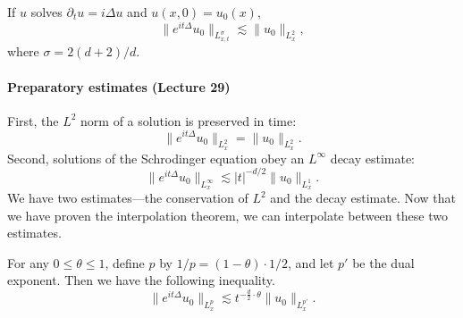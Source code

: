 \begin{theorem}
If $u$ solves $\partial_tu=i\Delta u$ and $u(x,0)=u_0(x)$,
\[\|e^{it\Delta}u_0\|_{L^\sigma_{x,t}}\lesssim\|u_0\|_{L^2_x},\tag{2}\]
where $\sigma=2(d+2)/d$.
\end{theorem}
\paragraph{Preparatory estimates (Lecture 29)}
First, the $L^2$ norm of a solution is preserved in time:
\[\|e^{it\Delta}u_0\|_{L^2_x}=\|u_0\|_{L^2_x}.\]
Second, solutions of the Schrodinger equation obey an $L^\infty$ decay estimate:
\[\|e^{it\Delta}u_0\|_{L^\infty_x}\lesssim|t|^{-d/2}\|u_0\|_{L^1_x}.\]
We have two estimates---the conservation of $L^2$ and the decay estimate. Now that we have proven the interpolation theorem, we can interpolate between these two estimates.
\begin{proposition}
For any $0\leq\theta\leq1$, define $p$ by $1/p=(1-\theta)\cdot1/2$, and let $p'$ be the dual exponent. Then we have the following inequality.
\[\|e^{it\Delta}u_0\|_{L^p_x}\lesssim t^{-\frac d2\cdot\theta}\|u_0\|_{L^{p'}_x}.\]
\end{proposition}
